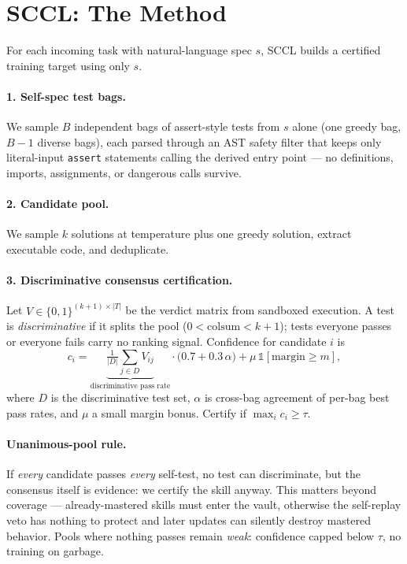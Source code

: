 \documentclass[10pt,conference]{IEEEtran}
\begin{document}
\section{SCCL: The Method}
\label{sec:method}
For each incoming task with natural-language spec $s$, SCCL builds a certified training target using only $s$.

\paragraph{1. Self-spec test bags.} We sample $B$ independent bags of assert-style tests from $s$ alone (one greedy bag, $B{-}1$ diverse bags), each parsed through an AST safety filter that keeps only literal-input \texttt{assert} statements calling the derived entry point --- no definitions, imports, assignments, or dangerous calls survive.

\paragraph{2. Candidate pool.} We sample $k$ solutions at temperature plus one greedy solution, extract executable code, and deduplicate.

\paragraph{3. Discriminative consensus certification.} Let $V \in \{0,1\}^{(k+1)\times |T|}$ be the verdict matrix from sandboxed execution. A test is \emph{discriminative} if it splits the pool ($0 < \text{colsum} < k{+}1$); tests everyone passes or everyone fails carry no ranking signal. Confidence for candidate $i$ is
\begin{equation}
c_i = \underbrace{\tfrac{1}{|D|}\textstyle\sum_{j \in D} V_{ij}}_{\text{discriminative pass rate}}
\cdot \bigl(0.7 + 0.3\,\alpha\bigr) + \mu\,\mathbb{1}[\text{margin} \ge m],
\end{equation}
where $D$ is the discriminative test set, $\alpha$ is cross-bag agreement of per-bag best pass rates, and $\mu$ a small margin bonus. Certify if $\max_i c_i \ge \tau$.

\paragraph{Unanimous-pool rule.} If \emph{every} candidate passes \emph{every} self-test, no test can discriminate, but the consensus itself is evidence: we certify the skill anyway. This matters beyond coverage --- already-mastered skills must enter the vault, otherwise the self-replay veto has nothing to protect and later updates can silently destroy mastered behavior. Pools where nothing passes remain \emph{weak}: confidence capped below $\tau$, no training on garbage.
\end{document}
